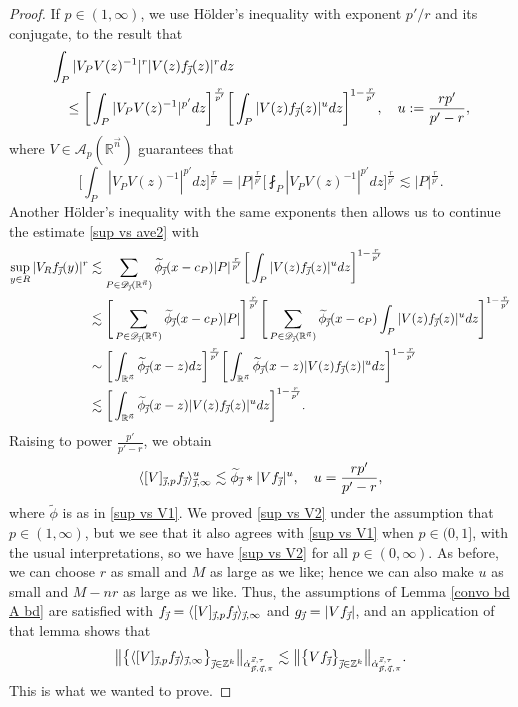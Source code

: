 \documentclass[11pt, reqno]{amsart}
\theoremstyle{definition}
\theoremstyle{remark}
\numberwithin{equation}{section}
\newcommand{\A}{\mathscr A}
\newcommand{\D}{\mathscr D}
\newcommand{\R}{\mathbb R}
\newcommand{\Z}{\mathbb Z}
\newcommand{\vj}{\vec{\textit{\j}}}
\newcommand{\vn}{\vec n}
\newcommand{\vp}{\vec p}
\newcommand{\vq}{\vec q}
\newcommand{\vs}{\vec s}
\newcommand{\aatau}{\dot{\alpha}^{\vs,\tau}_{\vp,\vq,\pi}}
\newcommand{\Ave}[3]{\langle#1\rangle_{#2,#3}}
\newcommand{\Red}[3]{[#1]_{#2,#3}}
\newcommand{\abs}[1]{|#1|}
\newcommand{\bNorm}[2]{\big\|#1\big\|_{#2}}
\begin{document}
\begin{proof}
If $p\in(1,\infty)$, we use H\"older's inequality with exponent $p'/r$ and its conjugate, to the result that
\begin{align*}
&\int_P \abs{V_P V(z)^{-1}}^r \abs{V(z) f_{\vj}(z)}^r dz \\
&\quad\leq \bigg[\int_P \abs{V_P V(z)^{-1}}^{p'} dz \bigg]^{\frac{r}{p'}}
\bigg[\int_P \abs{V(z)f_{\vj}(z)}^{u} dz\bigg]^{1-\frac{r}{p'}},
\quad u:=\frac{rp'}{p'-r},
\end{align*}
where $V\in\A_p(\R^{\vn})$ guarantees that
\begin{equation*}
\bigg[\int_P \abs{V_P V(z)^{-1}}^{p'} dz \bigg]^{\frac{r}{p'}}
=\abs{P}^{\frac{r}{p'}}
\bigg[\fint_P \abs{V_P V(z)^{-1}}^{p'} dz\bigg]^{\frac{r}{p'}}
\lesssim\abs{P}^{\frac{r}{p'}}.
\end{equation*}
Another H\"older's inequality with the same exponents then allows us to continue the estimate \eqref{sup vs ave2} with
\begin{align*}
\sup_{y\in R}\abs{V_R f_{\vj}(y)}^r
&\lesssim \sum_{P\in\D_{\vj}(\R^{\vn})}\widetilde\phi_{\vj}(x-c_P)\abs{P}^{\frac{r}{p'}}
\bigg[ \int_P \abs{V(z) f_{\vj}(z)}^{u} dz \bigg]^{1-\frac{r}{p'}} \\
&\lesssim \Bigg[\sum_{P\in\D_{\vj}(\R^{\vn})}\widetilde\phi_{\vj}(x-c_P)\abs{P}\Bigg]^{ \frac{r}{p'} }
\Bigg[\sum_{P\in\D_{\vj}(\R^{\vn})}\widetilde\phi_{\vj}(x-c_P)\int_P \abs{V(z)f_{\vj}(z)}^{u} dz \Bigg]^{1-\frac{r}{p'}} \\
&\sim \bigg[\int_{\R^{\vn}}\widetilde\phi_{\vj}(x-z) dz\bigg]^{\frac{r}{p'}}
\bigg[\int_{\R^{\vn}} \widetilde\phi_{\vj}(x-z)\abs{V(z) f_{\vj}(z)}^{u} dz\bigg]^{1-\frac{r}{p'}} \\
&\lesssim \bigg[\int_{\R^{\vn}} \widetilde\phi_{\vj}(x-z)\abs{V(z) f_{\vj}(z)}^{u} dz\bigg]^{1-\frac{r}{p'}}.
\end{align*}
Raising to power $\frac{p'}{p'-r}$, we obtain
\begin{equation}\label{sup vs V2}
\Ave{\Red{V}{\vj}{p}f_{\vj}}{\vj}{\infty}^u
\lesssim \widetilde\phi_{\vj}*\abs{Vf_{\vj}}^u,\quad u=\frac{rp'}{p'-r},
\end{equation}
where $\widetilde\phi$ is as in \eqref{sup vs V1}. We proved \eqref{sup vs V2} under the assumption that $p\in(1,\infty)$, but we see that it also agrees with \eqref{sup vs V1} when $p\in(0,1]$, with the usual interpretations, so we have \eqref{sup vs V2} for all $p\in(0,\infty)$. As before, we can choose $r$ as small and $M$ as large as we like; hence we can also make $u$ as small and $M-nr$ as large as we like. Thus, the assumptions of Lemma \ref{convo bd A bd} are satisfied with $f_{\vj}=\Ave{\Red{V}{\vj}{p}f_{\vj}}{\vj}{\infty}$ and $g_{\vj}=\abs{Vf_{\vj}}$, and an application of that lemma shows that
\begin{equation*}
\bNorm{\big\{\Ave{\Red{V}{\vj}{p}f_{\vj}}{\vj}{\infty}\big\}_{\vj\in\Z^k}}{\aatau}
\lesssim\bNorm{\big\{Vf_{\vj}\big\}_{\vj\in\Z^k}}{\aatau}.
\end{equation*}
This is what we wanted to prove.
\end{proof}
\end{document}
